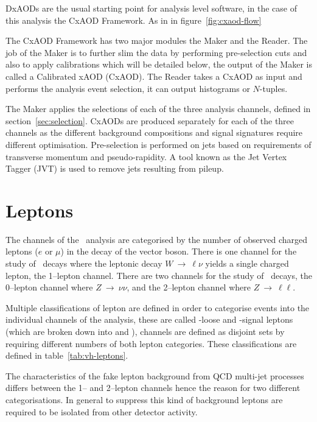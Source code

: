 DxAODs are the usual starting point for analysis level software, in the case of
this analysis the CxAOD Framework. As in in figure~\ref{fig:cxaod-flow}

The CxAOD Framework has two major modules the Maker and the Reader. The job of
the Maker is to further slim the data by performing pre-selection cuts and also
to apply calibrations which will be detailed below, the output of the Maker is
called a Calibrated xAOD (CxAOD). The Reader takes a CxAOD as input and performs
the analysis event selection, it can output histograms or $N$-tuples.

The Maker applies the selections of each of the three analysis channels, defined
in section~\ref{sec:selection}. CxAODs are produced separately for each of the
three channels as the different background compositions and signal signatures
require different optimisation. Pre-selection is performed on jets based on
requirements of transverse momentum and pseudo-rapidity. A tool known as the Jet
Vertex Tagger (JVT) is used to remove jets resulting from pileup.

\section{Leptons}%
\label{sec:lepton}

The channels of the \VHbb\ analysis are categorised by the number of
observed charged leptons ($e$ or $\mu$) in the decay of the vector boson. There
is one channel for the study of \WHbb\ decays where the leptonic
decay $W~\rightarrow~\ell\nu$ yields a single charged lepton, the 1--lepton
channel. There are two channels for the study of \ZHbb\ decays, the
0--lepton channel where $Z~\rightarrow~\nu\nu$, and the 2--lepton channel where
$Z~\rightarrow~\ell\ell$.

Multiple classifications of lepton are defined in order to categorise events into the
individual channels of the analysis, these are called \VH-loose and \VH-signal
leptons (which are broken down into \WH and \ZH), channels are defined as
disjoint sets by requiring different numbers of both lepton categories. These
classifications are defined in table~\ref{tab:vh-leptons}.

The characteristics of the fake lepton background from QCD multi-jet processes
differs between the 1-- and 2--lepton channels hence the reason for two
different categorisations. In general to suppress this kind of background
leptons are required to be isolated from other detector activity.

